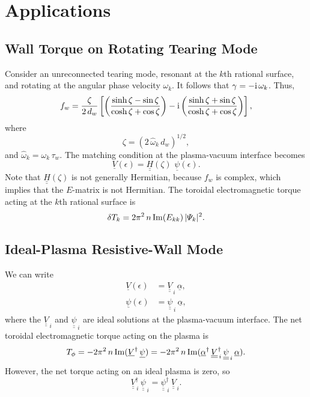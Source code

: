 \documentclass[12pt,prb,aps,notitlepage]{revtex4-1}
\begin{document}
\section{Applications}
\subsection{Wall Torque on Rotating Tearing Mode}
Consider an unreconnected tearing mode, resonant at the $k$th rational surface, and rotating at the angular phase velocity $\omega_k$. It follows that
$\gamma=-{\rm i}\,\omega_k$. Thus, 
\begin{equation}
f_w = \frac{\zeta}{2\,d_w}\left[\left(\frac{\sinh\zeta - \sin\zeta}{\cosh\zeta+\cos\zeta}\right)-{\rm i}\left(\frac{\sinh\zeta+ \sin\zeta}{\cosh\zeta+\cos\zeta}\right)\right],
\end{equation}
where
\begin{equation}
\zeta = (2\,\hat{\omega}_k\,d_w)^{1/2},
\end{equation}
and $\hat{\omega}_k=\omega_k\,\tau_w$. 
The matching condition at the plasma-vacuum interface becomes 
\begin{equation}
\underline{V}(\epsilon)= \underline{\underline{H}}(\zeta)\,\,\underline{\psi}(\epsilon).
\end{equation}
Note that $\underline{\underline{H}}(\zeta)$ is not generally Hermitian, because $f_w$ is complex,  which implies that
the $E$-matrix is not Hermitian. The toroidal electromagnetic torque acting at the $k$th rational surface is
\begin{equation}
\delta T_k = 2\pi^2\,n\,{\rm Im}(E_{kk})\,|{\mit\Psi}_k|^2.
\end{equation}

\subsection{Ideal-Plasma Resistive-Wall Mode}
We can write
\begin{align}\label{e78}
\underline{V}(\epsilon)&= \underline{\underline{V}}_{\,i}\,\underline{\alpha},\\[0.5ex]
\underline{\psi}(\epsilon)&= \underline{\underline{\psi}}_{\,i}\,\underline{\alpha},\label{e79}
\end{align}
where the $\underline{\underline{V}}_{\,i}$ and $\underline{\underline{\psi}}_{\,i}$ are ideal solutions at the plasma-vacuum interface.
The net toroidal electromagnetic torque acting on the plasma is
\begin{equation}
T_\phi= -2\pi^2\,n\,{\rm Im}(\underline{V}^\dag\,\underline{\psi})=-2\pi^2\,n\,{\rm Im}(\underline{\alpha}^\dag\,\underline{\underline{V}}_{\,i}^\dag
\,\underline{\underline{\psi}}_{\,i}\,\underline{\alpha}).
\end{equation}
However, the net torque acting on an ideal plasma is zero, so
\begin{equation}\label{e121}
\underline{\underline{V}}_{\,i}^\dag \,\underline{\underline{\psi}}_{\,i}=\underline{\underline{\psi}}_{\,i}^\dag \,\underline{\underline{V}}_{\,i}.
\end{equation}
\end{document}
